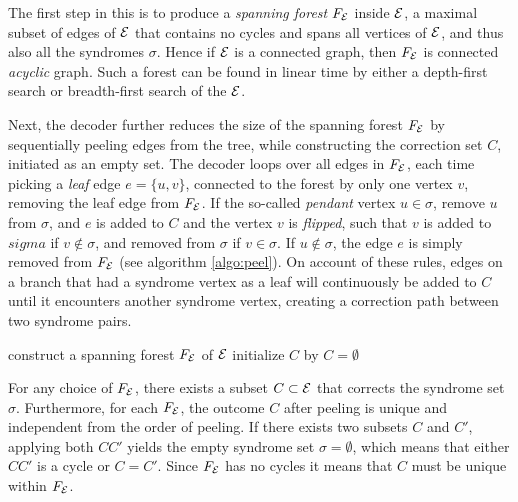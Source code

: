 The first step in this is to produce a \emph{spanning forest} $F_{\mathcal{E}}$ inside $\mathcal{E}$, a maximal subset of edges of $\mathcal{E}$ that contains no cycles and spans all vertices of $\mathcal{E}$, and thus also all the syndromes $\sigma$. Hence if $\mathcal{E}$ is a connected graph, then $F_{\mathcal{E}}$ is connected \emph{acyclic} graph. Such a forest can be found in linear time by either a depth-first search or breadth-first search of the $\mathcal{E}$. 

Next, the decoder further reduces the size of the spanning forest $F_{\mathcal{E}}$ by sequentially peeling edges from the tree, while constructing the correction set $C$, initiated as an empty set. The decoder loops over all edges in $F_{\mathcal{E}}$, each time picking a \emph{leaf} edge $e = \{u,v\}$, connected to the forest by only one vertex $v$, removing the leaf edge from $F_{\mathcal{E}}$. If the so-called \emph{pendant} vertex $u\in\sigma$, remove $u$ from $\sigma$, and $e$ is added to $C$ and the vertex $v$ is \emph{flipped}, such that $v$ is added to $sigma$ if $v \notin \sigma$, and removed from $\sigma$ if $v\in\sigma$.  If $u\notin\sigma$, the edge $e$ is simply removed from $F_{\mathcal{E}}$ (see algorithm \ref{algo:peel}). On account of these rules, edges on a branch that had a syndrome vertex as a leaf will continuously be added to $C$ until it encounters another syndrome vertex, creating a correction path between two syndrome pairs. 
\begin{algo}[algotitle=Peeling decoder \cite{delfosse2017linear}, label=algo:peel]
  \begin{algorithm}[H]
    \BlankLine
    construct a spanning forest $F_{\mathcal{E}}$ of $\mathcal{E}$\;
    initialize $C$ by $C = {\emptyset}$\;
  \end{algorithm}
\end{algo}
For any choice of $F_{\mathcal{E}}$, there exists a subset $C\subset\mathcal{E}$ that corrects the syndrome set $\sigma$. Furthermore, for each $F_{\mathcal{E}}$, the outcome $C$ after peeling is unique and independent from the order of peeling. If there exists two subsets $C$ and $C'$, applying both $CC'$ yields the empty syndrome set $\sigma=\emptyset$, which means that either $CC'$ is a cycle or $C=C'$. Since $F_{\mathcal{E}}$ has no cycles it means that $C$ must be unique within $F_{\mathcal{E}}$.
